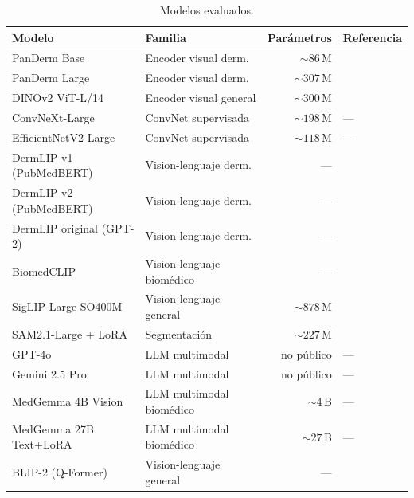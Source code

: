 \begin{table}[H]
\centering
\footnotesize
\setlength{\tabcolsep}{4pt}
\renewcommand{\arraystretch}{0.95}
\caption{Modelos evaluados.}
\label{tab:modelos}
\begin{tabular}{llrl}
\hline
Modelo & Familia & Parámetros & Referencia \\
\hline
PanDerm Base                & Encoder visual derm.       & $\sim 86$\,M & \cite{panderm2025} \\
PanDerm Large               & Encoder visual derm.       & $\sim 307$\,M & \cite{panderm2025} \\
DINOv2 ViT-L/14             & Encoder visual general     & $\sim 300$\,M & \cite{dinov2} \\
ConvNeXt-Large              & ConvNet supervisada        & $\sim 198$\,M & --- \\
EfficientNetV2-Large        & ConvNet supervisada        & $\sim 118$\,M & --- \\
DermLIP v1 (PubMedBERT)     & Vision-lenguaje derm.      & --- & \cite{derm1m} \\
DermLIP v2 (PubMedBERT)     & Vision-lenguaje derm.      & --- & \cite{derm1m} \\
DermLIP original (GPT-2)    & Vision-lenguaje derm.      & --- & \cite{derm1m} \\
BiomedCLIP                  & Vision-lenguaje biomédico  & --- & \cite{biomedclip} \\
SigLIP-Large SO400M         & Vision-lenguaje general    & $\sim 878$\,M & \cite{siglip2023} \\
SAM2.1-Large + LoRA         & Segmentación               & $\sim 227$\,M & \cite{sam2} \\
GPT-4o                      & LLM multimodal             & no público & --- \\
Gemini 2.5 Pro              & LLM multimodal             & no público & --- \\
MedGemma 4B Vision          & LLM multimodal biomédico   & $\sim 4$\,B & --- \\
MedGemma 27B Text+LoRA      & LLM multimodal biomédico   & $\sim 27$\,B & --- \\
BLIP-2 (Q-Former)           & Vision-lenguaje general    & --- & \cite{blip2_2023} \\
\hline
\end{tabular}
\end{table}

